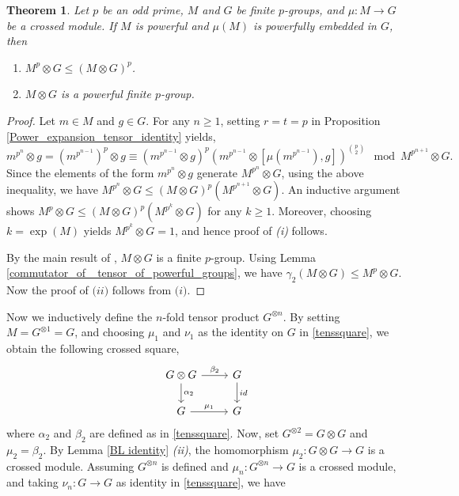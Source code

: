 \documentclass[12pt]{elsarticle}
\newtheorem{theorem}{Theorem}[section]
\newtheorem*{main corollary*}{Main Corollary}
\theoremstyle{definition}
\begin{document}
\begin{theorem}\label{T:Tensor of poweful crossed module}
    Let $p$ be an odd prime, $M$ and $G$ be finite $p$-groups, and $\mu:M\to G$ be a crossed module. If $M$ is powerful and $\mu(M)$ is powerfully embedded in $G$, then
    \begin{enumerate}
        \item[(i)] $M^p\otimes G\leqslant (M\otimes G)^p$.
        \item[(ii)] $M\otimes G$ is a powerful finite $p$-group.
    \end{enumerate}
    
\end{theorem}
\begin{proof}
    Let $m\in M$ and $g\in G$. For any $n\geq 1$, setting $r=t=p$ in Proposition \ref{Power_expansion_tensor_identity} yields,
    \begin{equation*}
        m^{p^n}\otimes g=(m^{p^{n-1}})^p\otimes g\equiv (m^{p^{n-1}}\otimes g)^p(m^{p^{n-1}}\otimes[\mu(m^{p^{n-1}}),g])^{\binom{p}{2}}\mod M^{p^{n+1}}\otimes G.
    \end{equation*}
    Since the elements of the form $m^{p^n}\otimes g$ generate $M^{p^n}\otimes G$, using the above inequality, we have ${M^{p^n}\otimes G\leqslant (M\otimes G)^p(M^{p^{n+1}}\otimes G)}$. An inductive argument shows $M^p\otimes G\leqslant (M\otimes G)^p(M^{p^k}\otimes G)$ for any $k\geq 1$. Moreover, choosing $k=\exp(M)$ yields $M^{p^k}\otimes G=1$, and hence proof of \textit{(i)} follows.
    \par By the main result of \cite{E87}, $M\otimes G$ is a finite $p$-group. Using Lemma \ref{commutator_of_ tensor_of_powerful_groups}, we have $\gamma_2(M\otimes G)\leqslant M^p\otimes G.$ Now the proof of $\textit{(ii)}$ follows from $\textit{(i)}.$
\end{proof}
Now we inductively define the $n$-fold tensor product $G^{\otimes n}$. By setting ${M=G^{\otimes 1}=G}$, and choosing $\mu_1$ and $\nu_1$ as the identity on $G$ in \eqref{tenssquare}, we obtain the following crossed square, 
  \begin{equation}
\begin{tikzcd}
		G\otimes G \arrow[r,"\beta_{2}"] \arrow[d,"\alpha_2"] & G \arrow[d,"id"] \\
		G \arrow[r,"\mu_1"] & G
	\end{tikzcd}\label{tensorsquare1}
\end{equation}
where $\alpha_2$ and $\beta_2$ are defined as in \eqref{tenssquare}. Now, set $G^{\otimes 2}=G\otimes G$ and $\mu_2=\beta_2$. By Lemma \ref{BL identity} \textit{(ii)}, the homomorphism $\mu_2:G\otimes G\to G$ is a crossed module.  Assuming $G^{\otimes {n}}$ is defined and $\mu_{n}:G^{\otimes {n}}\to G$ is a crossed module, and taking $\nu_{n}:G\to G$ as identity in \eqref{tenssquare}, we have
\end{document}
